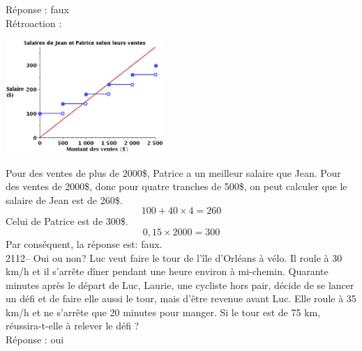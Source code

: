 \documentclass[letterpaper, 12pt]{article}
\begin{document}
R\'eponse : faux\\

R\'etroaction :
\begin{center}
 \includegraphics[width=6cm,bb=14 14 573 415]{Q2111v.eps}
\end{center}
Pour des ventes de plus de 2000\$, Patrice a un meilleur salaire que Jean. Pour des ventes de 2000\$, donc pour quatre tranches de 500\$, on peut calculer que le salaire de Jean est de 260\$.
\begin{equation*}
 100 + 40 \times 4 = 260
\end{equation*}
Celui de Patrice est de 300\$.
\begin{equation*}
 0,15 \times 2000 = 300
\end{equation*}
Par cons\'equent, la r\'eponse est: faux.\\


2112-- Oui ou non? Luc veut faire le tour de l'\^ile d'Orl\'eans \`a v\'elo. Il roule \`a 30 km/h et il s'arr\^ete d\^iner pendant une heure environ \`a mi-chemin.  Quarante minutes apr\`es le d\'epart de Luc, Laurie, une cycliste hors pair, d\'ecide de se lancer un d\'efi et de faire elle aussi le tour, mais d'\^etre revenue avant Luc. Elle roule \`a 35 km/h et ne s'arr\^ete que 20 minutes pour manger. Si le tour est de 75 km, r\'eussira-t-elle \`a relever le d\'efi ?\\

R\'eponse : oui\\
\end{document}
